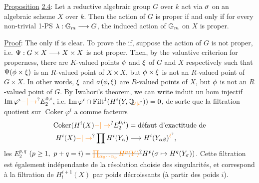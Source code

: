 \uline{Proposition} \uline{2.4}: Let a reductive algebraic group $G$ over $k$ act via $\sigma$ on an algebraic scheme $X$ over $k$. Then the action of $G$ is proper if and only if for every non-trivial 1-PS $\lambda:\mathbb{G}_m\longrightarrow G$, the induced action of $\mathbb{G}_m$ on $X$ is proper.

\uline{Proof}: The only if is clear. To prove the if, suppose the action of $G$ is not proper, i.e. $\Psi:G\times X\longrightarrow X\times X$ is not proper. Then, by the valuative criterion for properness, there are $K$-valued points $\phi$ and $\xi$ of $G$ and $X$ respectively such that $\Psi(\phi\times\xi)$ is an $R$-valued point of $X\times X$, but $\phi\times\xi$ is not an $R$-valued point of $G\times X$. In other words, $\xi$ and $\sigma(\phi,\xi)$ are $R$-valued points of $X$, but $\phi$ is not an $R$-valued point of $G$. By Iwahori's theorem, we can write
induit un hom injectif $\operatorname{Im}\varphi^i\unsure{-|\to}E_2^{0,i}$, i.e. $\operatorname{Im}\varphi^i\cap\operatorname{Filt}^1(H^i(Y,\mathbb{Q}_{\unsure{\ell|l}}))=0$, de sorte que  la filtration quotient sur $\operatorname{Coker}\varphi^i$ a comme facteurs 
\[
\begin{aligned}
\operatorname{Coker}(H^i(X)\unsure{-|\to}E_2^{0,i})&=\text{défaut d'exactitude de}\\
H^i(X)\unsure{-|\to}\prod H^i(Y_\alpha)&\longrightarrow H^i(Y_{\alpha\beta})^{\unsure{\ell}},
\end{aligned}
\]
les $E_2^{p,q}$ $(p\geq1,\ p+q=i)=\deleted{\unsure{\prod_{\alpha_0\cdots\alpha_p}H^p(Y)}}H^p(\sigma\mapsto H^q(Y_\sigma))$. Cette filtration est également indépendante de la résolution choisie des singularités, et correspond à la filtration de $H^{i+1}_!(X)$ par poids décroissants (à partir des poids $i$).

